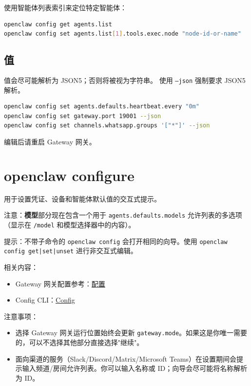 使用智能体列表索引来定位特定智能体：

\begin{lstlisting}[language=bash]
openclaw config get agents.list
openclaw config set agents.list[1].tools.exec.node "node-id-or-name"
\end{lstlisting}


\subsection{值}


值会尽可能解析为 JSON5；否则将被视为字符串。
使用 \texttt{--json} 强制要求 JSON5 解析。

\begin{lstlisting}[language=bash]
openclaw config set agents.defaults.heartbeat.every "0m"
openclaw config set gateway.port 19001 --json
openclaw config set channels.whatsapp.groups '["*"]' --json
\end{lstlisting}


编辑后请重启 Gateway 网关。


\clearpage

\section{openclaw configure}


用于设置凭证、设备和智能体默认值的交互式提示。

注意：\textbf{模型}部分现在包含一个用于 \texttt{agents.defaults.models} 允许列表的多选项（显示在 \texttt{/model} 和模型选择器中的内容）。

提示：不带子命令的 \texttt{openclaw config} 会打开相同的向导。使用 \texttt{openclaw config get|set|unset} 进行非交互式编辑。

相关内容：

\begin{itemize}
  \item Gateway 网关配置参考：\href{/gateway/configuration}{配置}
  \item Config CLI：\href{/cli/config}{Config}
\end{itemize}


注意事项：

\begin{itemize}
  \item 选择 Gateway 网关运行位置始终会更新 \texttt{gateway.mode}。如果这是你唯一需要的，可以不选择其他部分直接选择"继续"。
  \item 面向渠道的服务（Slack/Discord/Matrix/Microsoft Teams）在设置期间会提示输入频道/房间允许列表。你可以输入名称或 ID；向导会尽可能将名称解析为 ID。
\end{itemize}


